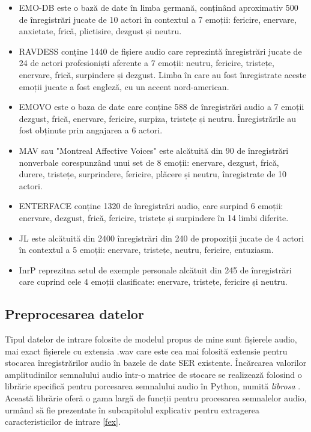 \documentclass[a4paper,12pt]{book}
\begin{document}
					\begin{itemize}
						\item EMO-DB \cite{emodb} este o bază de date în limba germană, conținând aproximativ 500 de înregistrări jucate de 10 actori în contextul a 7 emoții: fericire, enervare, anxietate, frică, plictisire, dezgust și neutru. 
						
						\item RAVDESS \cite{ravdess} conține 1440 de fișiere audio care reprezintă înregistrări jucate de 24 de actori profesioniști aferente a 7 emoții: neutru, fericire, tristețe, enervare, frică, surpindere și dezgust. Limba în care au fost înregistrate aceste emoții jucate a fost engleză, cu un accent nord-american.
						
						
						\item EMOVO \cite{emovo} este o baza de date care conține 588 de înregistrări audio a 7 emoții dezgust, frică, enervare, fericire, surpiza, tristețe și neutru. Înregistrările au fost obținute prin angajarea a 6 actori.
						
						\item MAV \cite{mav} sau "Montreal Affective Voices" este alcătuită din 90 de înregistrări nonverbale corespunzând unui set de 8 emoții: enervare, dezgust, frică, durere, tristețe, surprindere, fericire, plăcere și neutru, înregistrate de 10 actori.
						
						\item ENTERFACE \cite{enterface} conține 1320 de înregistrări audio, care surpind 6 emoții: enervare, dezgust, frică, fericire, tristețe și surpindere în 14 limbi diferite.
						
						\item JL \cite{JL} este alcătuită din 2400 înregistrări din 240 de propoziții jucate de 4 actori în contextul a 5 emoții: enervare, tristețe, neutru, fericire, entuziasm.
						
						\item InrP reprezitna setul de exemple personale alcătuit din 245 de înregistrări care cuprind cele 4 emoții clasificate: enervare, tristețe, fericire și neutru.							
					\end{itemize}
				
				\subsection{Preprocesarea datelor} \label{prepo}
					Tipul datelor de intrare folosite de modelul propus de mine sunt fișierele audio, mai exact fișierele cu extensia .wav care este cea mai folosită extensie pentru stocarea înregistrărilor audio în bazele de date SER existente. Încărcarea valorilor amplitudinilor semnalului audio într-o matrice de stocare se realizează folosind o librărie specifică pentru porcesarea semnalului audio în Python, numită \textit{librosa} \cite{librosa}. Această librărie oferă o gama largă de funcții pentru procesarea semnalelor audio,  urmând să fie prezentate în subcapitolul explicativ pentru extragerea caracteristicilor de intrare \ref{fex}.
					
\end{document}
